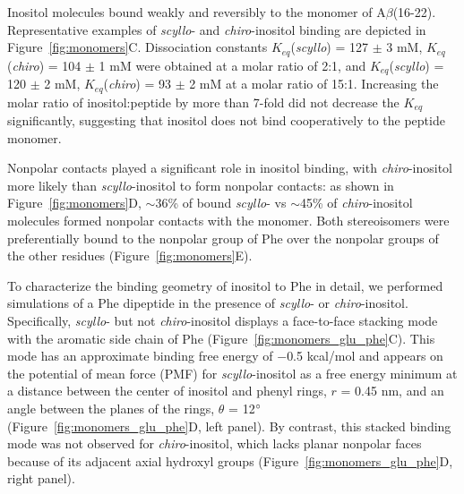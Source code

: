 Inositol molecules bound weakly and reversibly to the monomer of A$\beta$(16-22). Representative examples of \emph{scyllo}- and \emph{chiro}-inositol binding are depicted in Figure~\ref{fig:monomers}C. Dissociation constants $K_{eq}$(\emph{scyllo}) = 127 $\pm$ 3 mM, $K_{eq}$(\emph{chiro}) = 104 $\pm$ 1 mM were obtained at a molar ratio of 2:1, and $K_{eq}$(\emph{scyllo}) = 120 $\pm$ 2 mM, $K_{eq}$(\emph{chiro}) = 93 $\pm$ 2 mM at a molar ratio of 15:1. Increasing the molar ratio of inositol:peptide by more than 7-fold  did not decrease the $K_{eq}$ significantly, suggesting that inositol does not bind cooperatively to the peptide monomer.

Nonpolar contacts played a significant role in inositol binding, with \emph{chiro}-inositol more likely than \emph{scyllo}-inositol to form nonpolar contacts: as shown in Figure~{\ref{fig:monomers}}D, $\sim$36\% of bound \emph{scyllo}- vs $\sim$45\% of \emph{chiro}-inositol molecules formed nonpolar contacts with the monomer. Both stereoisomers were preferentially bound to the nonpolar group of Phe over the nonpolar groups of the other residues (Figure~\ref{fig:monomers}E).

To characterize the binding geometry of inositol to Phe in detail, we performed simulations of a Phe dipeptide in the presence of \emph{scyllo}- or \emph{chiro}-inositol. Specifically, \emph{scyllo}- but not \emph{chiro}-inositol displays a face-to-face stacking mode with the aromatic side chain of Phe (Figure~\ref{fig:monomers_glu_phe}C). This mode has an approximate binding free energy of $-$0.5 kcal/mol and appears on the potential of mean force (PMF) for \emph{scyllo}-inositol as a free energy minimum at a distance between the center of inositol and phenyl rings, $r$ = 0.45 nm, and an angle between the planes of the rings, $\theta$ = 12$^\circ$ (Figure~\ref{fig:monomers_glu_phe}D, left panel). By contrast, this stacked binding mode was not observed for \emph{chiro}-inositol, which lacks planar nonpolar faces because of its adjacent axial hydroxyl groups (Figure~\ref{fig:monomers_glu_phe}D, right panel). 

